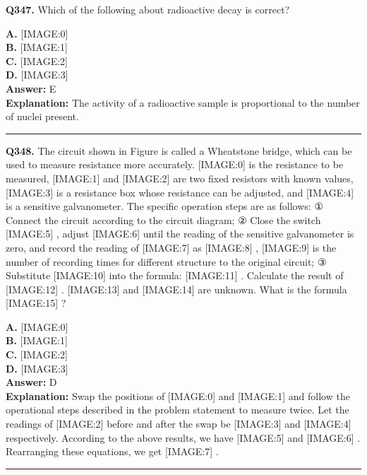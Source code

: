 \documentclass[12pt]{article}
\begin{document}
\noindent
\textbf{Q347.} Which of the following about radioactive decay is correct?



\textbf{A.} [IMAGE:0] \\
\textbf{B.} [IMAGE:1] \\
\textbf{C.} [IMAGE:2] \\
\textbf{D.} [IMAGE:3] \\

\textbf{Answer:} E \\
\textbf{Explanation:} The activity of a radioactive sample is proportional to the number of nuclei present.

\hrule
\vspace{1em}


\noindent
\textbf{Q348.} The circuit shown in Figure is called a Wheatstone bridge, which can be used to measure resistance more accurately.
[IMAGE:0]
is the resistance to be measured,
[IMAGE:1]
and
[IMAGE:2]
are two fixed resistors with known values,
[IMAGE:3]
is a resistance box whose resistance can be adjusted, and
[IMAGE:4]
is a sensitive galvanometer. The specific operation steps are as follows:
① Connect the circuit according to the circuit diagram;
② Close the switch
[IMAGE:5]
, adjust
[IMAGE:6]
until the reading of the sensitive galvanometer is zero, and record the reading of
[IMAGE:7]
as
[IMAGE:8]
,
[IMAGE:9]
is the number of recording times for different structure to the original circuit;
③ Substitute
[IMAGE:10]
into the formula:
[IMAGE:11]
. Calculate the result of
[IMAGE:12]
.
[IMAGE:13]
and
[IMAGE:14]
are unknown.
What is the formula
[IMAGE:15]
?



\textbf{A.} [IMAGE:0] \\
\textbf{B.} [IMAGE:1] \\
\textbf{C.} [IMAGE:2] \\
\textbf{D.} [IMAGE:3] \\

\textbf{Answer:} D \\
\textbf{Explanation:} Swap the positions of
[IMAGE:0]
and
[IMAGE:1]
and follow the operational steps described in the problem statement to measure twice. Let the readings of
[IMAGE:2]
before and after the swap be
[IMAGE:3]
and
[IMAGE:4]
respectively. According to the above results, we have
[IMAGE:5]
and
[IMAGE:6]
. Rearranging these equations, we get
[IMAGE:7]
.

\hrule
\vspace{1em}
\end{document}
